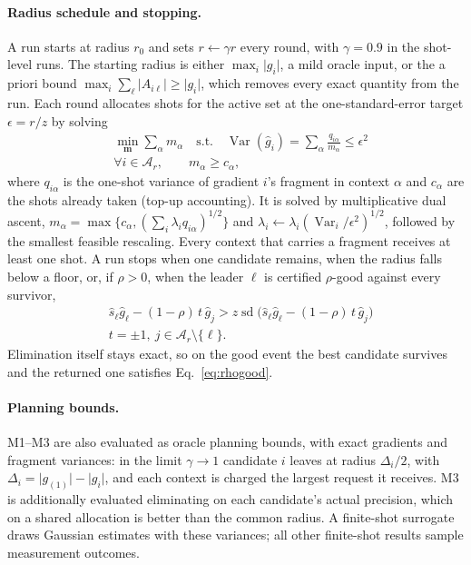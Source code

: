 \documentclass[aps,pra,reprint,superscriptaddress,nofootinbib]{revtex4-2}
\begin{document}
\paragraph{Radius schedule and stopping.} A run starts at radius $r_0$ and sets $r\leftarrow\gamma r$ every round, with $\gamma=0.9$ in the shot-level runs. The starting radius is either $\max_i\lvert g_i\rvert$, a mild oracle input, or the a priori bound $\max_i\sum_\ell\lvert A_{i\ell}\rvert\ge\lvert g_i\rvert$, which removes every exact quantity from the run. Each round allocates shots for the active set at the one-standard-error target $\epsilon=r/z$ by solving
\begin{equation}
\begin{split}
&\min_{\bm m}\sum_\alpha m_\alpha\quad\text{s.t.}\quad \operatorname{Var}(\hat g_i)=\sum_\alpha\frac{q_{i\alpha}}{m_\alpha}\le\epsilon^2\\
&\forall i\in\mathcal A_r,\qquad m_\alpha\ge c_\alpha ,
\end{split}
\label{eq:alloc}
\end{equation}
where $q_{i\alpha}$ is the one-shot variance of gradient $i$'s fragment in context $\alpha$ and $c_\alpha$ are the shots already taken (top-up accounting). It is solved by multiplicative dual ascent, $m_\alpha=\max\{c_\alpha,(\sum_i\lambda_iq_{i\alpha})^{1/2}\}$ and $\lambda_i\leftarrow\lambda_i(\operatorname{Var}_i/\epsilon^2)^{1/2}$, followed by the smallest feasible rescaling. Every context that carries a fragment receives at least one shot. A run stops when one candidate remains, when the radius falls below a floor, or, if $\rho>0$, when the leader $\ell$ is certified $\rho$-good against every survivor,
\begin{equation}
\begin{split}
&\hat s_\ell\hat g_\ell-(1-\rho)\,t\,\hat g_j>z\operatorname{sd}\big(\hat s_\ell\hat g_\ell-(1-\rho)\,t\,\hat g_j\big)\\
&t=\pm1,\ j\in\mathcal A_r\setminus\{\ell\}.
\end{split}
\label{eq:rhostop}
\end{equation}
Elimination itself stays exact, so on the good event the best candidate survives and the returned one satisfies Eq.~\eqref{eq:rhogood}.

\paragraph{Planning bounds.} M1--M3 are also evaluated as oracle planning bounds, with exact gradients and fragment variances: in the limit $\gamma\to1$ candidate $i$ leaves at radius $\Delta_i/2$, with $\Delta_i=\lvert g_{(1)}\rvert-\lvert g_i\rvert$, and each context is charged the largest request it receives. M3 is additionally evaluated eliminating on each candidate's actual precision, which on a shared allocation is better than the common radius. A finite-shot surrogate draws Gaussian estimates with these variances; all other finite-shot results sample measurement outcomes.
\end{document}
